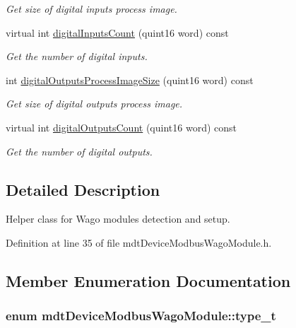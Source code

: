\begin{DoxyCompactItemize}
\begin{DoxyCompactList}\small\item\em Get size of digital inputs process image. \end{DoxyCompactList}\item 
virtual int \hyperlink{classmdt_device_modbus_wago_module_a96ae9148d769fec6905d360c5262d0eb}{digitalInputsCount} (quint16 word) const 
\begin{DoxyCompactList}\small\item\em Get the number of digital inputs. \end{DoxyCompactList}\item 
int \hyperlink{classmdt_device_modbus_wago_module_a40513e96468455295608a788eb1d8cac}{digitalOutputsProcessImageSize} (quint16 word) const 
\begin{DoxyCompactList}\small\item\em Get size of digital outputs process image. \end{DoxyCompactList}\item 
virtual int \hyperlink{classmdt_device_modbus_wago_module_ac425538b1ae0be825929d58a9713c788}{digitalOutputsCount} (quint16 word) const 
\begin{DoxyCompactList}\small\item\em Get the number of digital outputs. \end{DoxyCompactList}\end{DoxyCompactItemize}


\subsection{Detailed Description}
Helper class for Wago modules detection and setup. 

Definition at line 35 of file mdtDeviceModbusWagoModule.h.



\subsection{Member Enumeration Documentation}
\hypertarget{classmdt_device_modbus_wago_module_a2d8f6895b2a031c953bd91c2f65a1a25}{
\subsubsection[{type\_\-t}]{\setlength{\rightskip}{0pt plus 5cm}enum {\bf mdtDeviceModbusWagoModule::type\_\-t}}}
\label{classmdt_device_modbus_wago_module_a2d8f6895b2a031c953bd91c2f65a1a25}


